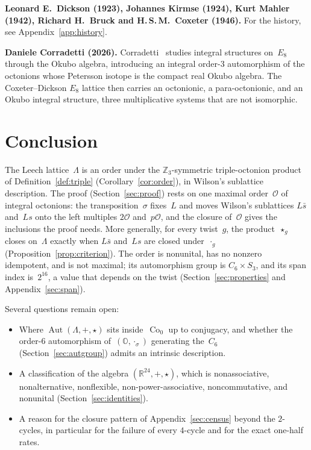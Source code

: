 \documentclass[twoside,english]{paper}
\numberwithin{equation}{section}
\numberwithin{figure}{section}
\theoremstyle{definition}
\theoremstyle{remark}
\newcommand{\OO}{\mathbb{O}}          %
\newcommand{\MO}{\mathcal{O}}         %
\newcommand{\RR}{\mathbb{R}}
\newcommand{\ZZ}{\mathbb{Z}}
\newcommand{\LL}{\Lambda}             %
\DeclareMathOperator{\Co}{Co}
\DeclareMathOperator{\Aut}{Aut}
\begin{document}
\textbf{Leonard E.~Dickson (1923), Johannes Kirmse (1924), Kurt Mahler
(1942), Richard H.~Bruck and H.\,S.\,M.~Coxeter (1946).}  For the
history, see Appendix~\ref{app:history}.

\textbf{Daniele Corradetti (2026).}  Corradetti~\cite{Corradetti2026}
studies integral structures on~$E_8$ through the Okubo algebra,
introducing an integral order-3 automorphism of the octonions whose
Petersson isotope is the compact real Okubo algebra.  The
Coxeter--Dickson $E_8$ lattice then carries an octonionic, a
para-octonionic, and an Okubo integral structure, three multiplicative
systems that are not isomorphic.

\section{Conclusion}\label{sec:conclusion}

The Leech lattice~$\LL$ is an order under the $\ZZ_3$-symmetric
triple-octonion product of Definition~\ref{def:triple}
(Corollary~\ref{cor:order}), in Wilson's sublattice description.  The
proof (Section~\ref{sec:proof}) rests on one maximal order~$\MO$ of
integral octonions: the transposition~$\sigma$ fixes~$L$ and moves
Wilson's sublattices $L\bar s$ and~$Ls$ onto the left multiples
$2\MO$ and~$p\MO$, and the closure of~$\MO$ gives the inclusions the
proof needs.  More generally, for every twist~$g$, the product~$\star_g$
closes on~$\LL$ exactly when $L\bar s$ and~$Ls$ are closed
under~$\cdot_g$ (Proposition~\ref{prop:criterion}).  The order is
nonunital, has no nonzero idempotent, and is
not maximal; its automorphism group is $C_6 \times S_3$, and its span
index is~$2^{16}$, a value that depends on the twist
(Section~\ref{sec:properties} and Appendix~\ref{sec:span}).

Several questions remain open:
\begin{itemize}
\item Where $\Aut(\LL, +, \star)$ sits inside~$\Co_0$ up to conjugacy,
  and whether the order-6 automorphism of~$(\OO, \cdot_\sigma)$ generating the~$C_6$
  (Section~\ref{sec:autgroup}) admits an intrinsic description.
\item A classification of the algebra $(\RR^{24}, +, \star)$, which is
  nonassociative, nonalternative, nonflexible, non-power-associative,
  noncommutative, and nonunital (Section~\ref{sec:identities}).
\item A reason for the closure pattern of Appendix~\ref{sec:census}
  beyond the $2$-cycles, in particular for the failure of every
  $4$-cycle and for the exact one-half rates.
\end{itemize}
\end{document}
